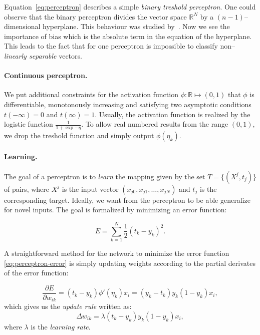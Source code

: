 Equation~\ref{eq:perceptron} describes a simple \emph{binary treshold perceptron}. One could observe that the binary perceptron divides the vector space $\mathbb{R}^N$ by a $(n-1)$--dimensional hyperplane. This behaviour was studied by~\citet{rosenblatt1958perceptron}. Now we see the importance of bias which is the absolute term in the equation of the hyperplane. \label{sec:linear-sep} This leads to the fact that for one perceptron is impossible to classify non--\emph{linearly separable} vectors. 

\paragraph{Continuous perceptron.}
We put additional constraints for the activation function $\phi : \mathbb{R} \mapsto (0,1)$ that $\phi$ is differentiable, monotonously increasing and satisfying two asymptotic conditions $t(-\infty)=0$ and $t(\infty)=1$.  Usually, the activation function is realized by the logistic function $\frac{1}{1 + \exp{-\eta}}$. To allow real numbered results from the range $(0,1)$, we drop the treshold function and simply output $\phi(\eta_k)$. 

\paragraph{Learning.} 
The goal of a perceptron is to \emph{learn} the mapping given by the set $T = \{(X^j, t_j)\}$ of pairs, where $X^j$ is the input vector $(x_{j0},x_{j1}, \ldots, x_{jN})$ and $t_j$ is the corresponding target. Ideally, we want from the perceptron to be able generalize for novel inputs. The goal is formalized by minimizing an error function: 

\begin{equation}
\label{eq:perceptron-error} 
E = \sum_{k=1}^{N} \frac{1}{2}(t_k-y_k)^2.
\end{equation} 

A straightforward method for the network to minimize the error function \ref{eq:perceptron-error} is simply updating weights according to the partial derivates of the error function: 

\begin{equation}
\label{eq:perceptron-learning} 
\frac{\partial E}{\partial w_{ik}} = (t_k - y_k)\phi'(\eta_k)x_i = (y_k - t_k)y_k(1 - y_k)x_i,
\end{equation} 
which gives us the \emph{update rule} written as: 
\
\begin{equation} 
\label{eq:perceptron-learning-rule} 
\Delta w_{ik} = \lambda (t_k - y_k)y_k(1 - y_k)x_i,
\end{equation} 
where $\lambda$ is the \emph{learning rate}. 

